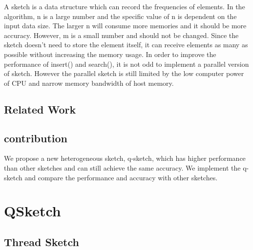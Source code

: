 \documentclass[conference]{IEEEtran}
\begin{document}

A sketch is a data structure which can record the frequencies of elements. In the algorithm, n is a large number and the specific value of n is dependent on the input data size. The larger n will consume more memories and it should be more accuracy. However, m is a small number and should not be changed. 
Since the sketch doesn't need to store the element itself, it can receive elements as many as possible without increasing the memory usage.  
In order to improve the performance of insert() and search(), it is not odd to implement a parallel version of sketch. However the parallel sketch is still limited by the low computer power of CPU and narrow memory bandwidth of host memory. 

\subsection{Related Work}
\subsection{contribution}
We propose a new heterogeneous sketch, q-sketch, which has higher performance than other sketches and can still achieve the same accuracy. We implement the q-sketch and compare the performance and accuracy with other sketches. 
\section{QSketch}
\subsection{Thread Sketch}
\end{document}
